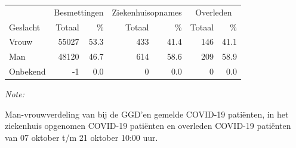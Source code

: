 \documentclass[
  english,
  man,floatsintext]{apa6}
\begin{document}
\begin{table}[H]
\centering\begingroup\fontsize{11}{13}\selectfont

\begin{threeparttable}
\begin{tabular}{lrrrrrr}
\toprule
\multicolumn{1}{c}{ } & \multicolumn{2}{c}{Besmettingen} & \multicolumn{2}{c}{Ziekenhuisopnames} & \multicolumn{2}{c}{Overleden} \\
\cmidrule(l{3pt}r{3pt}){2-3} \cmidrule(l{3pt}r{3pt}){4-5} \cmidrule(l{3pt}r{3pt}){6-7}
Geslacht & Totaal & \% & Totaal & \% & Totaal & \%\\
\midrule
Vrouw & 55027 & 53.3 & 433 & 41.4 & 146 & 41.1\\
Man & 48120 & 46.7 & 614 & 58.6 & 209 & 58.9\\
Onbekend & -1 & 0.0 & 0 & 0.0 & 0 & 0.0\\
\bottomrule
\end{tabular}
\begin{tablenotes}
\item \textit{Note: } 
\item Man-vrouwverdeling van bij de GGD’en gemelde COVID-19 patiënten, in het ziekenhuis opgenomen COVID-19 patiënten en overleden COVID-19 patiënten van 07 oktober t/m 21 oktober 10:00 uur.
\end{tablenotes}
\end{threeparttable}
\endgroup{}
\end{table}
\newpage
\end{document}
